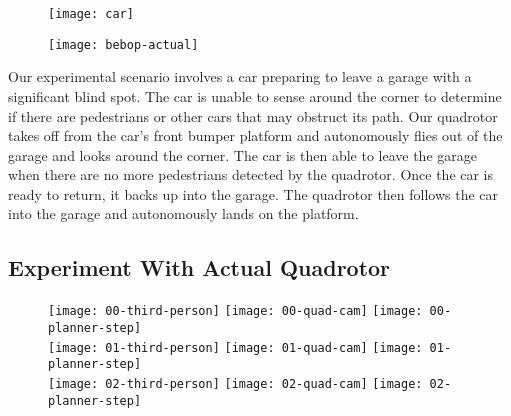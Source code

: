 \begin{figure}[h!]

    \centering

    \texttt{[image: car]}

    \caption{}

    \label{fig:car}

\end{figure}

\begin{figure}[h!]

    \centering

    \texttt{[image: bebop-actual]}

    \caption{}

    \label{fig:bebop-actual}

\end{figure}

Our experimental scenario involves a car preparing to leave a garage with a
significant blind spot. The car is unable to sense around the corner to
determine if there are pedestrians or other cars that may obstruct its path.
Our quadrotor takes off from the car's front bumper platform and autonomously
flies out of the garage and looks around the corner. The car is then able to
leave the garage when there are no more pedestrians detected by the quadrotor.
Once the car is ready to return, it backs up into the garage. The quadrotor
then follows the car into the garage and autonomously lands on the platform.

\subsection{Experiment With Actual Quadrotor}

\begin{figure}[h!]

    \centering

    \texttt{[image: 00-third-person]}
    \texttt{[image: 00-quad-cam]}
    \texttt{[image: 00-planner-step]} \\
    \texttt{[image: 01-third-person]}
    \texttt{[image: 01-quad-cam]}
    \texttt{[image: 01-planner-step]} \\
    \texttt{[image: 02-third-person]}
    \texttt{[image: 02-quad-cam]}
    \texttt{[image: 02-planner-step]}

\end{figure}
